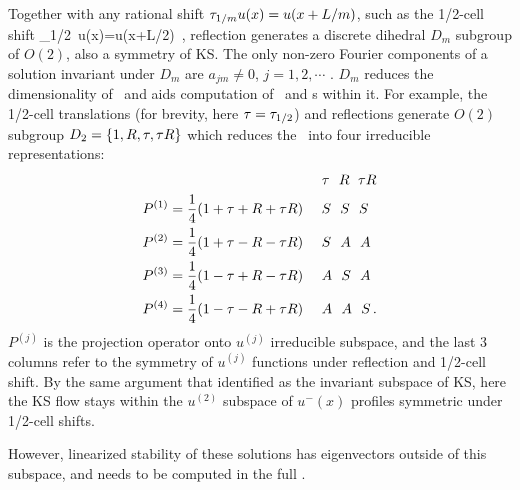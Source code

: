 {Together with any rational shift
$ \tau_{1/m}u(x)=u(x+L/m)$,
such as the 1/2-cell shift
\beq
    \Shift_{1/2}\, u(x)=u(x+L/2)
\,,
reflection generates a discrete dihedral $D_m$
subgroup of $O(2)$, also a symmetry of KS.
The only non-zero Fourier components of a solution invariant
under $D_m$ are $a_{jm} \neq 0$, $j =1,2,\cdots$ .
$D_m$ reduces the dimensionality
of \statesp\ and aids computation of \eqva\ and \po s
within it. For example, the 1/2-cell translations
(for brevity, here $\Shift = \Shift_{1/2}$)
and reflections generate $O(2)$
subgroup $D_2 = \{1, \Refl,\Shift,\Shift\Refl\}$
which
reduces the \statesp\ into four irreducible representations:
\begin{align}
 & \qquad\qquad\qquad\qquad\qquad
              ~~~ \Shift ~~ \Refl  ~\;  \Shift\Refl
    \nnu\\
P^{(1)} &= \frac{1}{4} (1 + \Shift + \Refl + \Shift\Refl)
           ~~~~  S  ~~  S   ~~   S
    \nnu\\
P^{(2)} &= \frac{1}{4} (1 + \Shift - \Refl - \Shift\Refl)
            ~~~~  S  ~~  A   ~~   A
    \nnu\\
P^{(3)} &= \frac{1}{4} (1 - \Shift + \Refl - \Shift\Refl)
           ~~~~  A  ~~  S   ~~   A
     \label{ek_defn}\\
P^{(4)} &= \frac{1}{4} (1 - \Shift - \Refl + \Shift\Refl)
          ~~~~  A  ~~  A   ~~   S
\,.
    \nnu
\end{align}
$P^{(j)}$ is the projection operator onto
$u^{(j)}$ irreducible subspace, and the last 3 columns
refer to the symmetry of
$u^{(j)}$ functions under reflection and
1/2-cell shift.
By the same argument that identified  as
the invariant subspace of KS, here the KS flow
stays within the $u^{(2)}$ subspace
of $u^-(x)$ profiles symmetric under 1/2-cell shifts.


  However, linearized stability of these solutions has
eigenvectors outside of this subspace, and needs to be
computed in the full \statesp.

}
